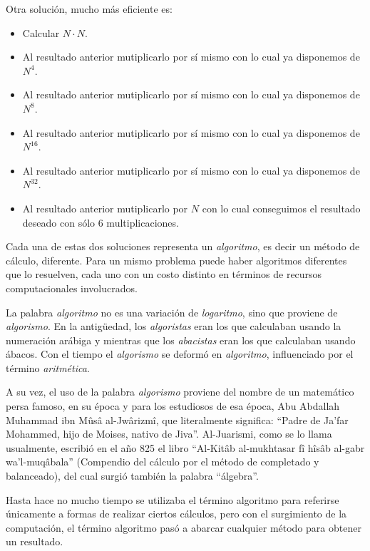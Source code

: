 Otra solución, mucho más eficiente es:
\begin{itemize}
\item Calcular $N \cdot N$.

\item Al resultado anterior mutiplicarlo por sí mismo con lo cual
ya disponemos de $N^{4}$.

\item Al resultado anterior mutiplicarlo por sí mismo con lo cual
ya disponemos de $N^{8}$.

\item Al resultado anterior mutiplicarlo por sí mismo con lo cual
ya disponemos de $N^{16}$.

\item Al resultado anterior mutiplicarlo por sí mismo con lo cual
ya disponemos de $N^{32}$.

\item Al resultado anterior mutiplicarlo por $N$ con lo cual
conseguimos el resultado deseado con sólo 6 multiplicaciones.

\end{itemize}

Cada una de estas dos soluciones representa un \emph{algoritmo}, es
decir un método de cálculo, diferente. Para un mismo problema
puede haber algoritmos diferentes que lo resuelven, cada uno con
un costo distinto en términos de recursos computacionales
involucrados.

\begin{sabias_que}
La palabra \textit{algoritmo} no es una variación de \textit{logaritmo},
sino que proviene de \textit{algorismo}. En la antigüedad, los
\textit{algoristas} eran los que calculaban usando la numeración arábiga y
mientras que los \textit{abacistas} eran los que calculaban usando ábacos.
Con el tiempo el \textit{algorismo} se deformó en \textit{algoritmo},
influenciado por el término \textit{aritmética}.

A su vez, el uso de la palabra \textit{algorismo} proviene del nombre de un
matemático persa famoso, en su época y para los estudiosos de esa época,
Abu Abdallah Muhammad ibn Mûsâ al-Jwârizmî, que literalmente significa:
``Padre de Ja'far Mohammed, hijo de Moises, nativo de Jiva''. Al-Juarismi,
como se lo llama usualmente, escribió en el año 825 el libro ``Al-Kitâb
al-mukhtasar fî hîsâb al-gabr wa'l-muqâbala'' (Compendio del cálculo por el
método de completado y balanceado), del cual surgió también la palabra
``álgebra''.

Hasta hace no mucho tiempo se utilizaba el término algoritmo para referirse
únicamente a formas de realizar ciertos cálculos, pero con el surgimiento
de la computación, el término algoritmo pasó a abarcar cualquier método
para obtener un resultado.
\end{sabias_que}

